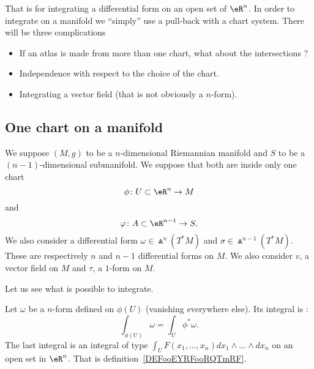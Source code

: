 That is for integrating a differential form on an open set of \( \eR^n\). In order to integrate on a manifold we ``simply'' use a pull-back with a chart system. There will be three complications
\begin{itemize}
    \item If an atlas is made from more than one chart, what about the intersections ?
    \item Independence with respect to the choice of the chart.
    \item Integrating a vector field (that is not obviously a \( n\)-form).
\end{itemize}

\subsection{One chart on a manifold}

We suppose \( (M,g)\) to be a \( n\)-dimensional Riemannian manifold and \( S\) to be a \( (n-1)\)-dimensional submanifold. We suppose that both are inside only one chart
\begin{equation}
    \phi\colon U\subset \eR^n\to M
\end{equation}
and
\begin{equation}
    \varphi\colon A\subset \eR^{n-1}\to S.
\end{equation}
We also consider a differential form \( \omega\in \Wedge^n(T^*M)\) and \( \sigma\in\Wedge^{n-1}(T^*M)\). These are respectively \( n\) and \( n-1\) differential forms on \( M\).  We also consider \( v\), a vector field on \( M\) and \( \tau\), a \( 1\)-form on \(M\).

Let us see what is possible to integrate.

\begin{definition}       \label{DEFooPDRCooPiBklC}
    Let \( \omega\) be a \( n\)-form defined on \( \phi(U)\) (vanishing everywhere else). Its integral is :
    \begin{equation}
        \int_{\phi(U)}\omega=\int_U\phi^*\omega.
    \end{equation}
    The last integral is an integral of type \( \int_{U}F(x_1,\ldots, x_n)dx_1\wedge\ldots \wedge dx_n\) on an open set in \( \eR^n\). That is definition~\ref{DEFooEYRFooRQTmRF}.
\end{definition}

